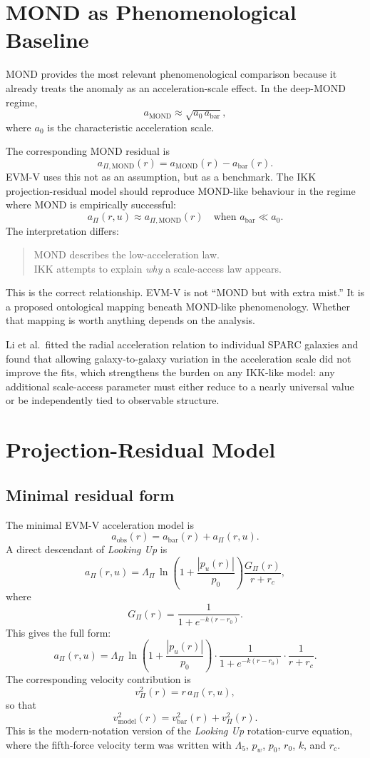\documentclass[11pt,a4paper,oneside]{article}
\newcommand{\aobs}{a_{\mathrm{obs}}}
\newcommand{\abar}{a_{\mathrm{bar}}}
\newcommand{\aPi}{a_{\Pi}}
\newcommand{\aMOND}{a_{\mathrm{MOND}}}
\newcommand{\aPiM}{a_{\Pi,\mathrm{MOND}}}
\newcommand{\vbar}{v_{\mathrm{bar}}}
\newcommand{\vPi}{v_{\Pi}}
\newcommand{\vmod}{v_{\mathrm{model}}}
\newcommand{\LamPi}{\Lambda_{\Pi}}
\newcommand{\pzero}{p_0}
\newcommand{\rc}{r_c}
\newcommand{\rzero}{r_0}
\newcommand{\pu}{p_u}
\newcommand{\pw}{p_w}      %
\newcommand{\usc}{u}                    %
\newcommand{\GPi}{G_{\Pi}}
\begin{document}
\section{MOND as Phenomenological Baseline}

MOND provides the most relevant phenomenological comparison because it already treats
the anomaly as an acceleration-scale effect. In the deep-MOND regime,
\[
    \aMOND \approx \sqrt{a_0\,\abar},
\]
where $a_0$ is the characteristic acceleration scale.

The corresponding MOND residual is
\[
    \aPiM(r) = \aMOND(r) - \abar(r).
\]
EVM-V uses this not as an assumption, but as a benchmark. The IKK projection-residual
model should reproduce MOND-like behaviour in the regime where MOND is empirically
successful:
\[
    \aPi(r,\usc) \approx \aPiM(r) \quad \text{when } \abar \ll a_0.
\]
The interpretation differs:
\begin{quote}
MOND describes the low-acceleration law.\\[2pt]
IKK attempts to explain \emph{why} a scale-access law appears.
\end{quote}
This is the correct relationship. EVM-V is not ``MOND but with extra mist.'' It is a
proposed ontological mapping beneath MOND-like phenomenology. Whether that mapping is
worth anything depends on the analysis.

Li et al.\ fitted the radial acceleration relation to individual SPARC galaxies and
found that allowing galaxy-to-galaxy variation in the acceleration scale did not improve
the fits, which strengthens the burden on any IKK-like model: any additional
scale-access parameter must either reduce to a nearly universal value or be
independently tied to observable structure.

\section{Projection-Residual Model}

\subsection{Minimal residual form}

The minimal EVM-V acceleration model is
\[
    \aobs(r) = \abar(r) + \aPi(r,\usc).
\]
A direct descendant of \emph{Looking Up} is
\[
    \aPi(r,\usc) = \LamPi\,\ln\!\left(1 + \frac{|\pu(r)|}{\pzero}\right)
    \frac{\GPi(r)}{r + \rc},
\]
where
\[
    \GPi(r) = \frac{1}{1 + e^{-k(r-\rzero)}}.
\]
This gives the full form:
\[
    \aPi(r,\usc) = \LamPi\,\ln\!\left(1 + \frac{|\pu(r)|}{\pzero}\right)
    \cdot\frac{1}{1 + e^{-k(r-\rzero)}}
    \cdot\frac{1}{r+\rc}.
\]
The corresponding velocity contribution is
\[
    \vPi^2(r) = r\,\aPi(r,\usc),
\]
so that
\[
    \vmod^2(r) = \vbar^2(r) + \vPi^2(r).
\]
This is the modern-notation version of the \emph{Looking Up} rotation-curve equation,
where the fifth-force velocity term was written with $\Lambda_5$, $\pw$, $\pzero$,
$\rzero$, $k$, and $\rc$.
\end{document}
